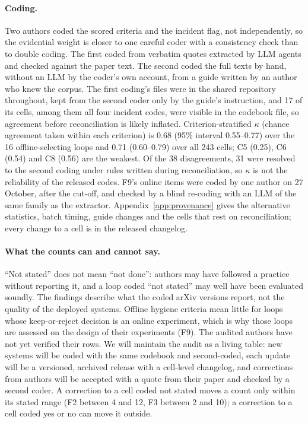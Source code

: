 \documentclass[sigconf,nonacm]{acmart}
\begin{document}
\paragraph{Coding.} Two authors coded the scored criteria and the incident flag, not independently, so the evidential
weight is closer to one careful coder with a consistency check than to double coding. The first coded from verbatim
quotes extracted by LLM agents and checked against the paper text. The second coded the full texts by hand, without an
LLM by the coder's own account, from a guide written by an author who knew the corpus. The first coding's files were in
the shared repository throughout, kept from the second coder only by the guide's instruction, and 17 of its cells,
among them all four incident codes, were visible in the codebook file, so agreement before reconciliation is likely
inflated. Criterion-stratified $\kappa$ (chance agreement taken within each criterion) is 0.68 (95\% interval
0.55--0.77) over the 16 offline-selecting loops and 0.71 (0.60--0.79) over all 243 cells; C5 (0.25), C6 (0.54) and C8
(0.56) are the weakest. Of the 38 disagreements, 31 were resolved to the second coding under rules written during
reconciliation, so $\kappa$ is not the reliability of the released codes. F9's online items were coded by one author on
27 October, after the cut-off, and checked by a blind re-coding with an LLM of the same family as the extractor.
Appendix~\ref{app:provenance} gives the alternative statistics, batch timing, guide changes and the cells that rest on
reconciliation; every change to a cell is in the released changelog.

\paragraph{What the counts can and cannot say.} ``Not stated'' does not mean ``not done'': authors may have followed a
practice without reporting it, and a loop coded ``not stated'' may well have been evaluated soundly. The findings
describe what the coded arXiv versions report, not the quality of the deployed systems. Offline hygiene criteria mean
little for loops whose keep-or-reject decision is an online experiment, which is why those loops are assessed on the
design of their experiments (F9). The audited authors have not yet verified their rows. We will maintain the audit as
a living table: new systems will be coded with the same codebook and second-coded, each update will be a versioned,
archived release with a cell-level changelog, and corrections from authors will be accepted with a quote from their
paper and checked by a second coder. A correction to a cell coded not stated moves a count only within its stated
range (F2 between 4 and 12, F3 between 2 and 10); a correction to a cell coded yes or no can move it outside.
\end{document}
